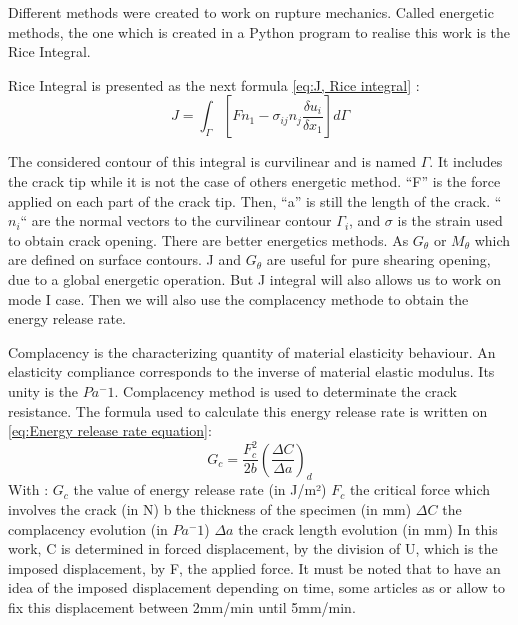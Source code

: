 Different methods were created to work on rupture mechanics. Called energetic methods, the one which is created in a Python program to realise this work is the Rice Integral.

Rice Integral is presented as the next formula \ref{eq:J, Rice integral} :
\begin{equation}
	J=\int_{\Gamma}[F n_{1}-\sigma_{ij} n_{j} \frac{\delta u_{i}}{\delta x_{1}}]d\Gamma
	\label{eq:J, Rice integral}
\end{equation}  

The considered contour of this integral is curvilinear and is named $\Gamma$. It includes the crack tip while it is not the case of others energetic method. “F” is the force applied on each part of the crack tip. Then, “a” is still the length of the crack. “$n_i$“ are the normal vectors to the curvilinear contour $\Gamma_{i}$, and $\sigma$ is the strain used to obtain crack opening. 
There are better energetics methods. As $G_{\theta}$ or $M_{\theta}$ which are defined on surface contours. J and $G_{\theta}$ are useful for pure shearing opening, due to a global energetic operation. But J integral will also allows us to work on mode I case. Then we will also use the complacency methode to obtain the energy release rate.

Complacency is the characterizing quantity of material elasticity behaviour. An elasticity compliance corresponds to the inverse of material elastic modulus. Its unity is the $Pa^-1$.
Complacency method is used to determinate the crack resistance. 
The formula used to calculate this energy release rate is written on \ref{eq:Energy release rate equation}:
\begin{equation}
	G_{c}= \frac{F_{c}^2}{2b} (\frac{\Delta C}{\Delta a})_{d} 	
	\label{eq:Energy release rate equation}
\end{equation}  
With : 
$G_c$ the value of energy release rate (in J/m²)
$F_c$ the critical force which involves the crack (in N)
b the thickness of the specimen (in mm)
$\Delta C$ the complacency evolution (in $Pa^-1$)
$\Delta a$ the crack length evolution (in mm)
In this work, C is determined in forced displacement, by the division of U, which is the imposed displacement, by F, the applied force. It must be noted that to have an idea of the imposed displacement depending on time, some articles as \parencite{Reference7} or \parencite{reference15} allow to fix this displacement between 2mm/min until 5mm/min.



